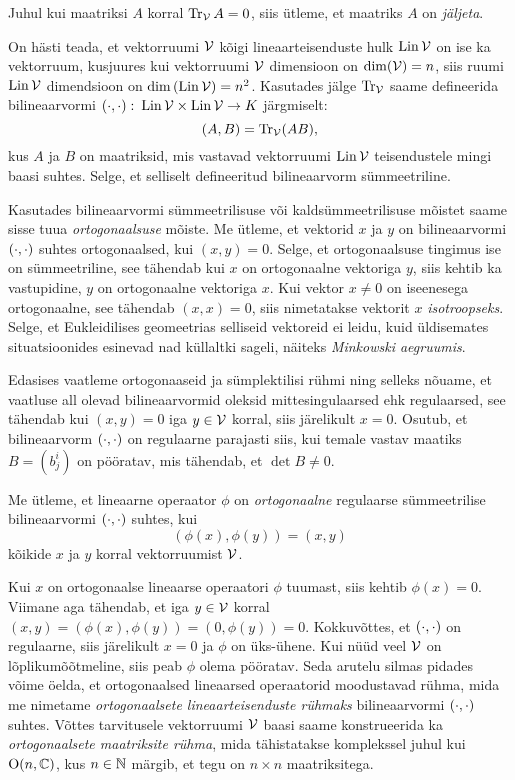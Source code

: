 Juhul kui maatriksi $A$ korral $\operatorname{Tr}_{\mathcal{V}} A = 0$, siis ütleme, et
maatriks $A$ on \emph{jäljeta}.

\begin{naide}
    On hästi teada, et vektorruumi $\mathcal{V}$ kõigi lineaarteisenduste hulk $\operatorname{Lin} \mathcal{V}$
    on ise ka vektorruum, kusjuures kui vektorruumi $\mathcal{V}$ dimensioon
    on $\dim(\mathcal{V}) = n$, siis ruumi $\operatorname{Lin} \mathcal{V}$ dimendsioon on
    $\dim \left(\operatorname{Lin} \mathcal{V}\right) = n^2$. Kasutades jälge $\operatorname{Tr}_{\mathcal{V}}$ saame
    defineerida bilineaarvormi
    $\left( \cdot, \cdot \right) \colon \operatorname{Lin} \mathcal{V} \times \operatorname{Lin} \mathcal{V} \to K$ järgmiselt:
    \[ (A, B) = \operatorname{Tr}_{\mathcal{V}}(AB), \]
    kus $A$ ja $B$ on maatriksid, mis vastavad vektorruumi $\operatorname{Lin} \mathcal{V}$
    teisendustele mingi baasi suhtes. Selge, et selliselt defineeritud
    bilineaarvorm sümmeetriline.
\end{naide}

Kasutades bilineaarvormi sümmeetrilisuse või kaldsümmeetrilisuse mõistet
saame sisse tuua \emph{ortogonaalsuse} mõiste. Me ütleme, et vektorid $x$ ja $y$
on bilineaarvormi $\left( \cdot, \cdot \right)$ suhtes ortogonaalsed, kui $(x, y) = 0$. Selge, et
ortogonaalsuse tingimus ise on sümmeetriline, see tähendab kui $x$ on
ortogonaalne vektoriga $y$, siis kehtib ka vastupidine, $y$ on ortogonaalne
vektoriga $x$. Kui vektor $x \neq 0$ on iseenesega ortogonaalne, see tähendab
$(x, x) = 0$, siis nimetatakse vektorit $x$ \emph{isotroopseks}. Selge, et
Eukleidilises geomeetrias selliseid vektoreid ei leidu, kuid üldisemates
situatsioonides esinevad nad küllaltki sageli, näiteks
\emph{Minkowski aegruumis}.

Edasises vaatleme ortogonaaseid ja sümplektilisi rühmi ning selleks
nõuame, et vaatluse all olevad bilineaarvormid oleksid mittesingulaarsed
ehk regulaarsed, see tähendab kui $(x, y) = 0$ iga $y \in \mathcal{V}$ korral, siis
järelikult $x = 0$. Osutub, et bilineaarvorm $\left( \cdot, \cdot \right)$ on regulaarne parajasti
siis, kui temale vastav maatiks $B = (b^i_j)$ on pööratav, mis tähendab,
et $\det B \neq 0$.

\begin{dfn}
    Me ütleme, et lineaarne operaator $\phi$ on \emph{ortogonaalne}
    regulaarse sümmeetrilise bilineaarvormi $\left( \cdot, \cdot \right)$ suhtes, kui
    \[ (\phi(x), \phi(y)) = (x, y) \]
    kõikide $x$ ja $y$ korral vektorruumist $\mathcal{V}$.
\end{dfn}

Kui $x$ on ortogonaalse lineaarse operaatori $\phi$ tuumast, siis
kehtib $\phi(x) = 0$. Viimane aga tähendab, et iga $y \in \mathcal{V}$ korral
$(x, y) = (\phi(x), \phi(y)) = (0, \phi(y)) = 0$. Kokkuvõttes,
et $\left( \cdot, \cdot \right)$ on regulaarne, siis järelikult $x = 0$ ja $\phi$ on üks-ühene.
Kui nüüd veel $\mathcal{V}$ on lõplikumõõtmeline, siis peab $\phi$ olema pööratav.
Seda arutelu silmas pidades võime öelda, et ortogonaalsed lineaarsed
operaatorid moodustavad rühma, mida me nimetame \emph{ortogonaalsete
lineaarteisenduste rühmaks} bilineaarvormi $\left( \cdot, \cdot \right)$ suhtes.
Võttes tarvitusele vektorruumi $\mathcal{V}$ baasi saame konstrueerida ka
\emph{ortogonaalsete maatriksite rühma}, mida tähistatakse komplekssel juhul
kui $\operatorname{O}(n, \mathbb{C})$, kus $n \in \mathbb{N}$ märgib, et tegu on $n \times n$ maatriksitega.

